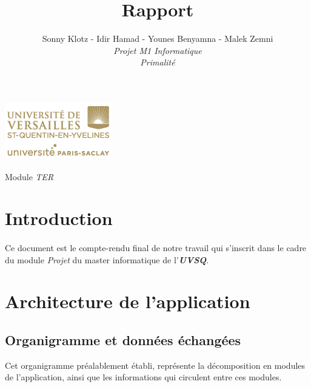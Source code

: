 

\title{\vspace{\fill}\textbf{\Huge Rapport}}
\author{
	Sonny Klotz - Idir Hamad - Younes Benyamna - Malek Zemni
	\vspace{2em}\\
	\textit{Projet M1 Informatique}\\\textit{Primalité}
	\vspace{2em}
}


\clearpage
\maketitle\vspace{9em}
\begin{center}\includegraphics[scale=0.7]{logo.png}\end{center}
\begin{flushright}Module \textit{TER}\end{flushright}
\newpage
\tableofcontents
\newpage\clearpage{}

	\section*{Introduction}
	
	\paragraph{}Ce document est le compte-rendu final de notre travail qui s'inscrit dans le cadre du module \textit{Projet} du master informatique de l'\textit{\textbf{UVSQ}}.
	
	
	\section{Architecture de l'application}
		\subsection{Organigramme et données échangées}
		Cet organigramme préalablement établi, représente la décomposition en modules de l'application, ainsi que les informations qui circulent entre ces modules.
		
